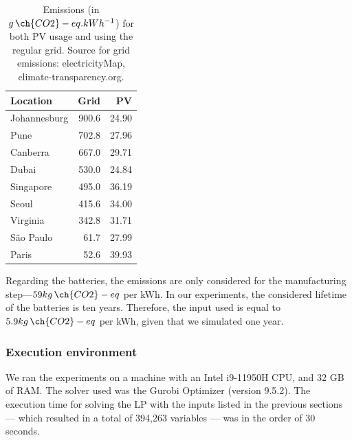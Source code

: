 \begin{table}
  
  \caption{Emissions (in $g\,\ch{CO2}-eq.kWh^{-1}$) for both PV usage and using the regular grid. Source for grid emissions: electricityMap, climate-transparency.org.}\label{tab:carbonfootprint} \centering

  \begin{tabular}{|l|r|r|}
    
  \hline

  \textbf{Location} &  \textbf{Grid} & \textbf{PV} \\
  \hline
  Johannesburg & 900.6 & 24.90 \\
  \hline
  Pune & 702.8 & 27.96 \\
  \hline
  Canberra & 667.0 & 29.71 \\
  \hline
  Dubai & 530.0  & 24.84 \\
  \hline
  Singapore & 495.0 & 36.19 \\
  \hline     
  Seoul & 415.6 & 34.00 \\
  \hline
  Virginia  & 342.8 & 31.71 \\
  \hline
  São Paulo &  61.7 & 27.99\\
  \hline 
  Paris &  52.6  & 39.93 \\
  \hline  

\end{tabular}  
\end{table}

Regarding the batteries, the emissions are only considered for the manufacturing step---$59 kg\,\ch{CO2}-eq$ per kWh. In our experiments, the considered lifetime of the batteries is ten years. Therefore, the input used is equal to $5.9 kg\,\ch{CO2}-eq$ per kWh, given that we simulated one year.


\subsubsection{Execution environment}
We ran the experiments on a machine with an Intel i9-11950H CPU, and 32 GB of RAM. The solver used was the Gurobi Optimizer (version 9.5.2). The execution time for solving the LP with the inputs listed in the previous sections --- which resulted in a total of 394,263 variables --- was in the order of 30 seconds.


